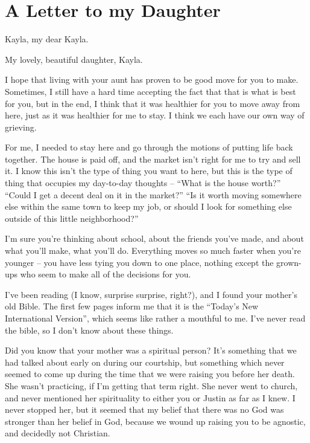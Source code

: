 \chapter{A Letter to my Daughter}

\begin{itshape}
Kayla, my dear Kayla.

My lovely, beautiful daughter, Kayla.

I hope that living with your aunt has proven to be good move for you to make.  Sometimes, I still have a hard time accepting the fact that that is what is best for you, but in the end, I think that it was healthier for you to move away from here, just as it was healthier for me to stay.  I think we each have our own way of grieving.

For me, I needed to stay here and go through the motions of putting life back together.  The house is paid off, and the market isn't right for me to try and sell it.  I know this isn't the type of thing you want to here, but this is the type of thing that occupies my day-to-day thoughts -- ``What is the house worth?''  ``Could I get a decent deal on it in the market?''  ``Is it worth moving somewhere else within the same town to keep my job, or should I look for something else outside of this little neighborhood?''

I'm sure you're thinking about school, about the friends you've made, and about what you'll make, what you'll do.  Everything moves so much faster when you're younger -- you have less tying you down to one place, nothing except the grown-ups who seem to make all of the decisions for you.

I've been reading (I know, surprise surprise, right?), and I found your mother's old Bible.  The first few pages inform me that it is the ``Today's New International Version'', which seems like rather a mouthful to me.  I've never read the bible, so I don't know about these things.

Did you know that your mother was a spiritual person?  It's something that we had talked about early on during our courtship, but something which never seemed to come up during the time that we were raising you before her death.  She wasn't practicing, if I'm getting that term right.  She never went to church, and never mentioned her spirituality to either you or Justin as far as I knew.  I never stopped her, but it seemed that my belief that there was no God was stronger than her belief in God, because we wound up raising you to be agnostic, and decidedly not Christian.


\end{itshape}
